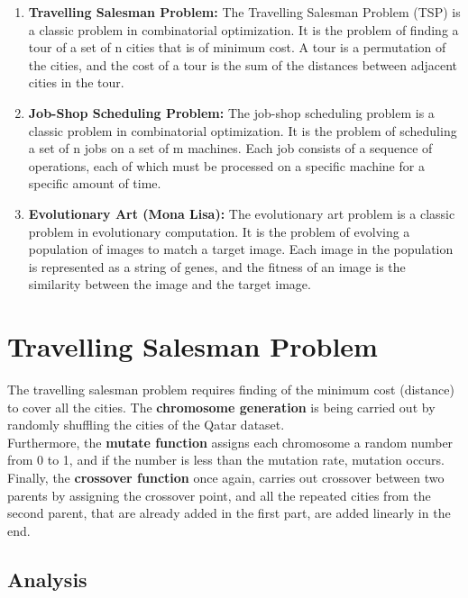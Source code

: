 \documentclass[12pt]{article}
\begin{document}
\begin{enumerate}
    \item \textbf{Travelling Salesman Problem:} The Travelling Salesman Problem (TSP) is a classic problem in combinatorial optimization. It is the problem of finding a tour of a set of n cities that is of minimum cost. A tour is a permutation of the cities, and the cost of a tour is the sum of the distances between adjacent cities in the tour.
    \item \textbf{Job-Shop Scheduling Problem:} The job-shop scheduling problem is a classic problem in combinatorial optimization. It is the problem of scheduling a set of n jobs on a set of m machines. Each job consists of a sequence of operations, each of which must be processed on a specific machine for a specific amount of time.
    \item \textbf{Evolutionary Art (Mona Lisa):} The evolutionary art problem is a classic problem in evolutionary computation. It is the problem of evolving a population of images to match a target image. Each image in the population is represented as a string of genes, and the fitness of an image is the similarity between the image and the target image.
\end{enumerate}

\section{Travelling Salesman Problem}

The travelling salesman problem requires finding of the minimum cost (distance) to cover all the cities. The \textbf{chromosome generation} is being carried out by randomly shuffling the cities of the Qatar dataset. 
\newline \\
Furthermore, the \textbf{mutate function} assigns each chromosome a random number from 0 to 1, and if the number is less than the mutation rate, mutation occurs. 
\newline \\
Finally, the \textbf{crossover function} once again, carries out crossover between two parents by assigning the crossover point, and all the repeated cities from the second parent, that are already added in the first part, are added linearly in the end. 

\subsection{Analysis}
\end{document}

